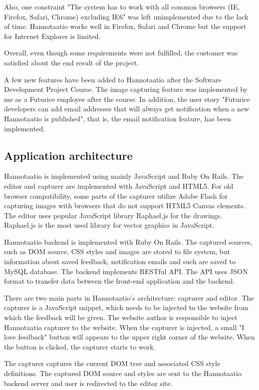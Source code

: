 \documentclass[english,12pt,a4paper,pdftex]{article}
\begin{document}
Also, one constraint "The system has to work with all common browsers (IE, Firefox, Safari, Chrome) excluding IE6" was left unimplemented due to the lack of time. Hannotaatio works well in Firefox, Safari and Chrome but the support for Internet Explorer is limited.

Overall, even though some requirements were not fulfilled, the customer was satisfied about the end result of the project.

A few new features have been added to Hannotaatio after the Software Development Project Course. The image capturing feature was implemented by me as a Futurice employee after the course. In addition, the user story "Futurice developers can add email addresses that will always get notification when a new Hannotaatio is published", that is, the email notification feature, has been implemented.

\subsection{Application architecture}

Hannotaatio is implemented using mainly JavaScript and Ruby On Rails. The editor and capturer are implemented with JavaScript and HTML5. For old browser compatibility, some parts of the capturer utilize Adobe Flash for capturing images with browsers that do not support HTML5 Canvas elements. The editor uses popular JavaScript library Raphael.js for the drawings. Raphael.js is the most used library for vector graphics in JavaScript.

Hannotaatio backend is implemented with Ruby On Rails. The captured sources, such as \ac{DOM} source, \ac{CSS} styles and images are stored to file system, but information about saved feedback, notification emails and such are saved to MySQL database. The backend implements RESTful \ac{API}. The \ac{API} uses JSON format to transfer data between the front-end application and the backend.

There are two main parts in Hannotaatio's architecture: capturer and editor. The capturer is a JavaScript snippet, which needs to be injected to the website from which the feedback will be given. The website author is responsible to inject Hannotaatio capturer to the website. When the capturer is injected, a small "I love feedback" button will appears to the upper right corner of the website. When the button is clicked, the capturer starts to work. 

The capturer captures the current \ac{DOM} tree and associated \ac{CSS} style definitions. The captured \ac{DOM} source and styles are sent to the Hannotaatio backend server and user is redirected to the editor site.
\end{document}
